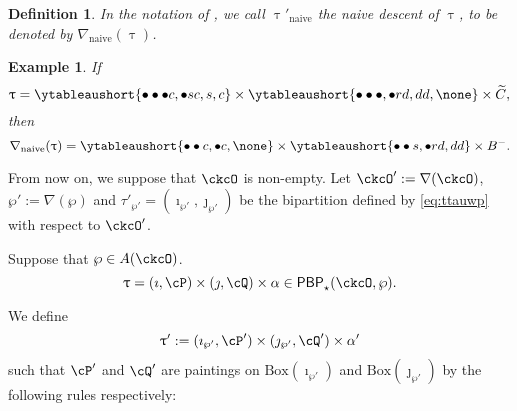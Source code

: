 \documentclass[12pt,a4paper]{amsart}
\let\ytb=\ytableaushort
\newcommand{\CO}{{\mathcal {O}}}
\def\tnaive{\mathrm{naive}}
\def\tauwpp{\tau'_{\wp'}}
\def\uptaupn{\uptau'_{\tnaive}}
\def\DD{\nabla}
\def\DDn{\nabla_{\tnaive}}
\numberwithin{equation}{section}
\newtheorem{defn}[thm]{Definition}
\newtheorem{eg}[thm]{Example}
\theoremstyle{remark}
\def\DD{\nabla}
\newcommand{\BOX}[1]{\mathrm{Box}(#1)}
\def\imathwpp{\imath_{\wp'}}
\def\jmathwpp{\jmath_{\wp'}}
\def\PBP{\mathsf{PBP}}
\def\PBPop#1#2#3#4{\PBP_{#1}^{#2}(#3,#4)}
\newcommand{\PBPOP}[1][]{\PBPop{\star}{#1}{\ckcO}{\wp}}
\begin{document}
\begin{defn}
 In the notation of , we call $\uptaupn$ the naive descent of $\uptau$, to be denoted by $\DDn(\uptau)$.
\end{defn}




 \begin{eg} If
    \[
     \uptau = \ytb{\bullet\bullet\bullet {c},\bullet {s} {c},{s},{c}}
    \times \ytb{\bullet\bullet\bullet ,\bullet {r} {d},{d}{d}, \none}
    \times \widetilde C, \]
   then
   \[
    \nabla_{\mathrm{naive}}(\uptau) =\ytb{\bullet\bullet{c} ,\bullet{c},\none }
    \times  \ytb{\bullet\bullet {s} ,\bullet {r} {d},{d}{d}}\times B^-.
    \]

\end{eg}


From now on, we suppose that $\ckcO$ is non-empty.
Let $\ckcO' := \DD(\ckcO)$, $\wp':=\DD(\wp)$ and $\tauwpp = (\imathwpp,\jmathwpp)$ be the
bipartition defined by \eqref{eq:ttauwp} with respect to $\ckcO'$.

Suppose that $\wp\in A(\ckcO)$.
\[
\uptau=(\imath,\cP)\times(\jmath,\cQ)\times \alpha \in  \PBPOP.
\]


We define
\[
  \uptau' := (\imathwpp, \cP')\times (\jmathwpp, \cQ')\times \alpha'
\]
such that $\cP'$ and $\cQ'$ are paintings on $\BOX{\imath_{\wp'}}$ and
$\BOX{\jmath_{\wp'}}$  %
by the following rules  respectively:



\end{document}
